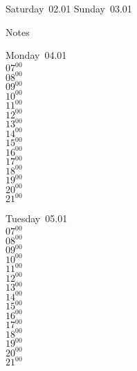 \documentclass[11pt,a4paper]{book}\usepackage[]{graphicx}\usepackage[]{color}
\begin{document}
\begin{weekendbox}
  Saturday~02.01
  \tcblower
  Sunday~03.01
\end{weekendbox} %
\begin{notebox}
  Notes
\end{notebox}
\clearpage
\begin{headerbox}
\end{headerbox}
\begin{weekdaybox}
  Monday~04.01\\
  { 
  \vfill
  $07^{00}$\\
$08^{00}$\\
$09^{00}$\\
$10^{00}$\\
$11^{00}$\\
$12^{00}$\\
$13^{00}$\\
$14^{00}$\\
$15^{00}$\\
$16^{00}$\\
$17^{00}$\\
$18^{00}$\\
$19^{00}$\\
$20^{00}$\\
$21^{00}$\\
  }
\end{weekdaybox}
\begin{weekdaybox}
  Tuesday~05.01\\
  { 
  \vfill
  $07^{00}$\\
$08^{00}$\\
$09^{00}$\\
$10^{00}$\\
$11^{00}$\\
$12^{00}$\\
$13^{00}$\\
$14^{00}$\\
$15^{00}$\\
$16^{00}$\\
$17^{00}$\\
$18^{00}$\\
$19^{00}$\\
$20^{00}$\\
$21^{00}$\\
  }
\end{weekdaybox}
\end{document}
